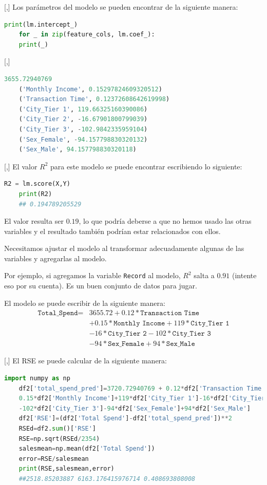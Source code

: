 [,]{}
Los parámetros del modelo se pueden encontrar de la siguiente manera:
\begin{lstlisting}[language=Python]
	print(lm.intercept_)
	for _ in zip(feature_cols, lm.coef_):
	print(_)
\end{lstlisting}

[,]{}
\begin{lstlisting}[language=Python]
	3655.72940769
	('Monthly Income', 0.15297824609320512)
	('Transaction Time', 0.12372608642619998)
	('City_Tier 1', 119.66325160390086)
	('City_Tier 2', -16.67901800799039)
	('City_Tier 3', -102.9842335959104)
	('Sex_Female', -94.157798830320132)
	('Sex_Male', 94.157798830320118)
\end{lstlisting}

[,]{}
El valor $R^2$ para este modelo se puede encontrar escribiendo lo siguiente:
\begin{lstlisting}[language=Python]
	R2 = lm.score(X,Y)
	print(R2)
	## 0.194789205529
\end{lstlisting}


El valor resulta ser $0.19$, lo que podría deberse a que no hemos usado las otras variables y el resultado también podrían estar relacionados con ellos. 

Necesitamos ajustar el
modelo al transformar adecuadamente algunas de las variables y agregarlas al modelo. 

Por ejemplo, si agregamos la variable \texttt{Record} al modelo, $R^2$ salta a $0.91$ (intente eso
por su cuenta). Es un buen conjunto de datos para jugar.

El modelo se puede escribir de la siguiente manera:
\begin{align}
	\texttt{Total\_Spend}= & 3655.72+0.12*\texttt{Transaction Time} \\ &+0.15*\texttt{Monthly Income}+119*\texttt{City\_Tier 1}\\
	& -16*\texttt{City\_Tier 2} - 102*\texttt{City\_Tier 3}\\
	& -94*\texttt{Sex\_Female}+94*\texttt{Sex\_Male}
\end{align}

[,]{}
El RSE se puede calcular de la siguiente manera:

\begin{lstlisting}[language=Python]
	import numpy as np
	df2['total_spend_pred']=3720.72940769 + 0.12*df2['Transaction Time']+ \
	0.15*df2['Monthly Income']+119*df2['City_Tier 1']-16*df2['City_Tier 2']
	-102*df2['City_Tier 3']-94*df2['Sex_Female']+94*df2['Sex_Male']
	df2['RSE']=(df2['Total Spend']-df2['total_spend_pred'])**2
	RSEd=df2.sum()['RSE']
	RSE=np.sqrt(RSEd/2354)
	salesmean=np.mean(df2['Total Spend'])
	error=RSE/salesmean
	print(RSE,salesmean,error)
	##2518.85203887 6163.176415976714 0.408693808008
\end{lstlisting}


